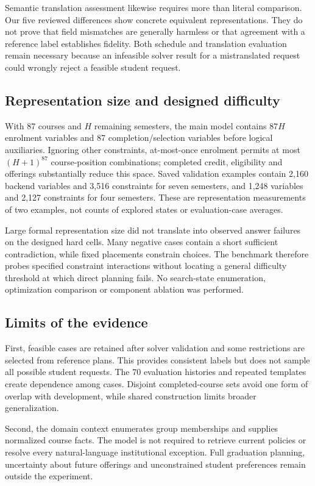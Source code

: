 \documentclass[11pt,a4paper]{article}
\begin{document}
Semantic translation assessment likewise requires more than literal
comparison. Our five reviewed differences show concrete equivalent
representations. They do not prove that field mismatches are generally
harmless or that agreement with a reference label establishes fidelity.
Both schedule and translation evaluation remain necessary because an
infeasible solver result for a mistranslated request could wrongly reject a
feasible student request.

\subsection{Representation size and designed difficulty}
With 87 courses and $H$ remaining semesters, the main model contains $87H$
enrolment variables and 87 completion/selection variables before logical
auxiliaries. Ignoring other constraints, at-most-once enrolment permits at
most $(H+1)^{87}$ course-position combinations; completed credit, eligibility
and offerings substantially reduce this space. Saved validation examples
contain 2,160 backend variables and 3,516 constraints for seven semesters,
and 1,248 variables and 2,127 constraints for four semesters. These are
representation measurements of two examples, not counts of explored states
or evaluation-case averages.

Large formal representation size did not translate into observed answer
failures on the designed hard cells. Many negative cases contain a short
sufficient contradiction, while fixed placements constrain choices.
The benchmark therefore probes specified constraint interactions without
locating a general difficulty threshold at which direct planning fails.
No search-state enumeration, optimization comparison or component ablation
was performed.

\subsection{Limits of the evidence}
First, feasible cases are retained after solver validation and some
restrictions are selected from reference plans. This provides consistent
labels but does not sample all possible student requests. The 70 evaluation
histories and repeated templates create dependence among cases. Disjoint
completed-course sets avoid one form of overlap with development, while
shared construction limits broader generalization.

Second, the domain context enumerates group memberships and supplies
normalized course facts. The model is not required to retrieve current
policies or resolve every natural-language institutional exception. Full
graduation planning, uncertainty about future offerings and unconstrained
student preferences remain outside the experiment.
\end{document}
